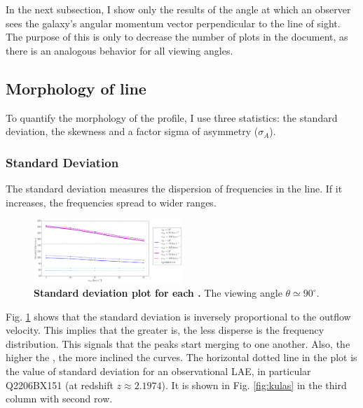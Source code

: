 \documentclass[twocolappendix]{latex/emulateapj}
\begin{document}
In the next subsection, I show only the results of the angle at which an observer sees the galaxy's angular momentum vector perpendicular to the line of sight. The purpose of this is only to decrease the number of plots in the document, as there is an analogous behavior for all viewing angles. \\

\subsection{Morphology of \lya line}
To quantify the morphology of the \lya profile, I use three statistics: the standard deviation, the skewness and a factor sigma of asymmetry ($\sigma_A$). \\

\subsubsection{Standard Deviation}
The standard deviation measures the dispersion of frequencies in the \lya line. If it increases, the frequencies spread to wider ranges. \\

\begin{figure}[h!]
	\begin{center}
		\includegraphics[width=0.5\textwidth]{./figures/std}
	\end{center}
	\caption{\textbf{Standard deviation plot for each \tauh.} The viewing angle $\theta \simeq 90^\circ$.
		\label{fig:std}}
\end{figure}

Fig. \ref{fig:std} shows that the standard deviation is inversely proportional to the outflow velocity. This implies that the greater \vout is, the less disperse is the \lya frequency distribution. This signals that the peaks start merging to one another. Also, the higher the \tauh, the more inclined the curves. The horizontal dotted line in the plot is the value of standard deviation for an observational LAE, in particular Q2206BX151 (at redshift $z\approx2.1974$). It is shown in Fig. \ref{fig:kulas} in the third column with second row. \\
\end{document}
